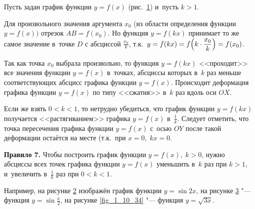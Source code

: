 
Пусть задан график функции $y = f(x)$ (рис.\ \ref{fig_1_10_31}) и~пусть $k>1$.

\begin{figure}\label{fig_1_10_31}
\end{figure}

Для произвольного значения аргумента $x_{0}$ (из области определения
функции $y = f(x))$ отрезок $AB = f(x_{0})$.
Но функция $y = f(kx)$ принимает то же самое значение в~точке $D$
с абсциссой $\displaystyle \frac{x_{0}}{k}$,
т.к.\ $\displaystyle y = f(kx) = f \Bigl( k \cdot \frac{x_{0}}{k} \Bigr) = f(x_{0})$.

Так как точка $x_{0}$ выбрала произвольно, то функция $y = f(kx)$
<<проходит>> все значения функции $y = f(x)$ в~точках, абсциссы которых
в~$k$ раз меньше соответствующих абсцисс графика функции $y = f(x)$.
Происходит деформация графика функции $y = f(x)$ по типу <<сжатия>>
в~$k$ раз вдоль оси $OX$.

Если же взять $0 < k < 1$, то нетрудно убедиться, что график функции
$y = f(kx)$ получается <<растягиванием>> графика
$y = f(x)$ в~$\displaystyle \frac{1}{k}$.
Следует отметить, что точка пересечения графика функции $y = f(x)$
с~осью $OY$ после такой деформации остаётся на месте
(т.к.\ при $x = 0, \; kx = 0$.

\textbf{Правило 7.} Чтобы построить график функции $y = f(x), \; k > 0$,
нужно абсциссы всех точек графика функции $y = f(x)$ уменьшить
в~$k$ раз при $k > 1$, и~увеличить в~$\displaystyle \frac{1}{k}$
раз при $0 < k < 1$.

\begin{figure}
\end{figure}

Например, на рисунке \ref{fig_1_10_32} изображён график функции $y = \sin 2x$,
на рисунке \ref{fig_1_10_33} "--- функция $\displaystyle y = \sin \frac{x}{2}$,
на рисунке \ref{fig_1_10_34} "--- функция $y = \sqrt{3x}$.

\begin{figure}\label{fig_1_10_32}
\end{figure}

\begin{figure}\label{fig_1_10_33}
\end{figure}

